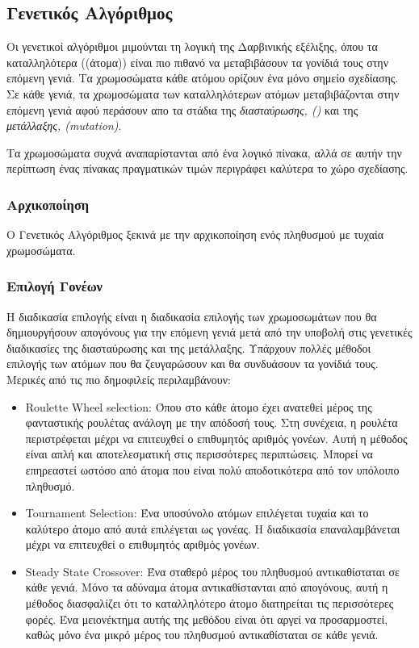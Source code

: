 \subsection{Γενετικός Αλγόριθμος}
\label{genetic-algorithm}

Οι γενετικοί αλγόριθμοι μιμούνται τη λογική της Δαρβινικής εξέλιξης, όπου τα
καταλληλότερα ((άτομα)) είναι πιο πιθανό να μεταβιβάσουν τα γονίδιά τους στην επόμενη
γενιά. Τα χρωμοσώματα κάθε ατόμου ορίζουν ένα μόνο σημείο σχεδίασης. Σε κάθε γενιά, τα χρωμοσώματα των καταλληλότερων ατόμων μεταβιβάζονται στην επόμενη γενιά αφού περάσουν απο τα στάδια της \emph{διασταύρωσης, ()}  και της \emph{μετάλλαξης, \latintext(mutation)}.

Τα χρωμοσώματα συχνά αναπαρίστανται από ένα λογικό πίνακα, αλλά σε αυτήν την περίπτωση ένας πίνακας πραγματικών τιμών περιγράφει καλύτερα το χώρο σχεδίασης.

\subsubsection{Αρχικοποίηση}

Ο Γενετικός Αλγόριθμος ξεκινά με την αρχικοποίηση ενός πληθυσμού με τυχαία χρωμοσώματα.

\subsubsection{Επιλογή Γονέων}

Η διαδικασία επιλογής είναι η διαδικασία επιλογής των χρωμοσωμάτων που θα δημιουργήσουν απογόνους για την επόμενη γενιά μετά από την υποβολή στις γενετικές διαδικασίες της διασταύρωσης και της μετάλλαξης. Υπάρχουν πολλές μέθοδοι επιλογής των ατόμων που θα ζευγαρώσουν και θα συνδυάσουν τα γονίδιά τους. Μερικές από τις πιο δημοφιλείς περιλαμβάνουν:

\begin{itemize}
\item
  \textlatin{Roulette Wheel selection:} Όπου στο κάθε άτομο έχει ανατεθεί μέρος της
  φανταστικής ρουλέτας ανάλογη με την απόδοσή τους. Στη συνέχεια, η ρουλέτα
  περιστρέφεται μέχρι να επιτευχθεί ο επιθυμητός αριθμός γονέων. Αυτή η μέθοδος είναι
  απλή και αποτελεσματική στις περισσότερες περιπτώσεις. Μπορεί να επηρεαστεί ωστόσο από
  άτομα που είναι πολύ αποδοτικότερα από τον υπόλοιπο πληθυσμό.
\item
  \textlatin{Tournament Selection}: Ένα υποσύνολο ατόμων επιλέγεται τυχαία
  και το καλύτερο άτομο από αυτά επιλέγεται ως γονέας. Η
  διαδικασία επαναλαμβάνεται μέχρι να επιτευχθεί ο επιθυμητός αριθμός γονέων.
\item
\textlatin{Steady State Crossover}: Ένα σταθερό μέρος του πληθυσμού αντικαθίσταται
  σε κάθε γενιά. Μόνο τα αδύναμα άτομα αντικαθίστανται από
  απογόνους, αυτή η μέθοδος διασφαλίζει ότι το καταλληλότερο άτομο
  διατηρείται τις περισσότερες φορές. Ένα μειονέκτημα αυτής της μεθόδου είναι ότι αργεί να προσαρμοστεί, καθώς μόνο ένα μικρό μέρος του πληθυσμού αντικαθίσταται σε κάθε γενιά.
\end{itemize}


